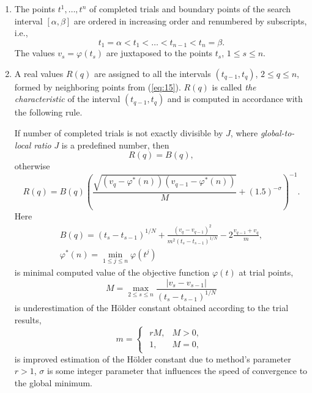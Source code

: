 \documentclass[]{interact}
\theoremstyle{plain}%
\theoremstyle{definition}
\theoremstyle{remark}
\begin{document}
\begin{enumerate}
\item 
The points $t^1, \dots, t^n$ of completed trials and boundary points of the search interval $[\alpha, \beta]$ are ordered in increasing order and renumbered by subscripts, i.e.,
\begin{equation}\label{eq:15}
t_1 = \alpha < t_1 < \dots < t_{n-1} < t_n = \beta.
\end{equation}
The values $v_s = \varphi(t_s)$ are juxtaposed to the points  $t_s$, $1 \leq s \leq n$.
\item 
A real values $R(q)$ are assigned to all the intervals $(t_{q-1}, t_q)$, $2 \leq q \leq n$, formed by neighboring points from (\ref{eq:15}). $R(q)$ is called \textit{the characteristic} of the interval $(t_{q-1}, t_q)$ and is computed in accordance with the following rule.

If number of completed trials is not exactly divisible by $J$, where \textit{global-to-local ratio} $J$ is a predefined number, then
\begin{equation}\label{eq:16}
R(q) = B(q),
\end{equation}
otherwise
\begin{equation}\label{eq:17}
R(q) = B(q)\left( \frac {\sqrt{(v_q - \varphi^*(n))(v_{q-1} - \varphi^*(n))}}{M} +(1.5)^{-\sigma}\right)^{-1}.
\end{equation}
Here
\begin{gather}\label{eq:18}
B(q) = (t_s - t_{s-1})^{1/N} + \frac{(v_q - v_{q-1})^2} {m^2 (t_s - t_{s-1})^{1/N}} -2\frac{v_{q-1} + v_q}{m},\\
\varphi^*(n) = \min_{1\leq j \leq n} {\varphi(t^j)}
\end{gather}
is minimal computed value of the objective function $\varphi(t)$ at trial points,
\begin{equation}\label{eq:19}
M = \max_{2 \leq  s \leq n} { \frac{|v_s - v_{s-1}|}{(t_s - t_{s-1})^{1/N}} }
\end{equation}
is underestimation of the H{\"o}lder constant obtained according to the trial results,
\begin{equation}\label{eq:20}
m = 
\begin{cases}
\begin{matrix}
rM, & M>0, \\
1, & M= 0,
\end{matrix}
\end{cases}
\end{equation}
is improved estimation of the H{\"o}lder constant due to method's parameter $r>1$, $\sigma$ is some integer parameter that influences the speed of convergence to the global minimum.


\end{enumerate}
\end{document}
